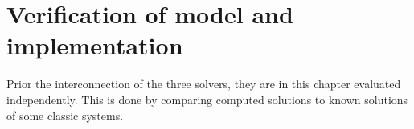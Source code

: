 \chapter{Verification of model and implementation}\label{sec:mb}
Prior the interconnection of the three solvers, they are in this
chapter evaluated independently. This is done by comparing computed
solutions to known solutions of some classic systems. 










